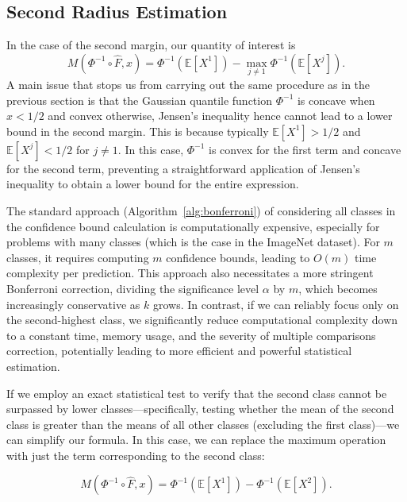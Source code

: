 \subsection{Second Radius Estimation}\label{subsec:second-radius-estimation-continuous}
In the case of the second margin, our quantity of interest is
\[
    M(\Phi^{-1}\circ\hat{F},x) = \Phi^{-1}\left(\mathbb{E}[X^1]\right)-\max_{j \neq 1}\Phi^{-1}\left(\mathbb{E}[X^j]\right).
\]
A main issue that stops us from carrying out the same procedure as in the previous section is that the Gaussian quantile function $\Phi^{-1}$ is concave when $x < 1/2$ and convex otherwise, Jensen's inequality hence cannot lead to a lower bound in the second margin.
This is because typically $\mathbb{E}[X^1] > 1/2$ and $\mathbb{E}[X^j] < 1/2$ for $j \neq 1$.
In this case, $\Phi^{-1}$ is convex for the first term and concave for the second term, preventing a straightforward application of Jensen's inequality to obtain a lower bound for the entire expression.

The standard approach (Algorithm~\ref{alg:bonferroni}) of considering all classes in the confidence bound calculation is computationally expensive, especially for problems with many classes (which is the case in the ImageNet dataset).
For $m$ classes, it requires computing $m$ confidence bounds, leading to $O(m)$ time complexity per prediction.
This approach also necessitates a more stringent Bonferroni correction, dividing the significance level $\alpha$ by $m$, which becomes increasingly conservative as $k$ grows.
In contrast, if we can reliably focus only on the second-highest class, we significantly reduce computational complexity down to a constant time, memory usage, and the severity of multiple comparisons correction, potentially leading to more efficient and powerful statistical estimation.

If we employ an exact statistical test to verify that the second class cannot be surpassed by lower classes—specifically, testing whether the mean of the second class is greater than the means of all other classes (excluding the first class)—we can simplify our formula.
In this case, we can replace the maximum operation with just the term corresponding to the second class:

\begin{equation}
    \label{eqn:jensen-approximation}
    M(\Phi^{-1}\circ\hat{F},x) = \Phi^{-1}\left(\mathbb{E}[X^1]\right) - \Phi^{-1}\left(\mathbb{E}[X^2]\right).
\end{equation}

